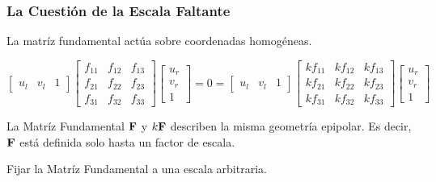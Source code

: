 \begin{frame}
    \frametitle{La Cuestión de la Escala Faltante}
    
    La matríz fundamental actúa sobre coordenadas homogéneas.

    \begin{equation*}
    \begin{bmatrix} u_l & v_l & 1 \end{bmatrix}
    \begin{bmatrix}
        f_{11} & f_{12} & f_{13} \\
        f_{21} & f_{22} & f_{23} \\
        f_{31} & f_{32} & f_{33}
    \end{bmatrix}
    \begin{bmatrix} u_r \\ v_r \\ 1 \end{bmatrix}
    = 0
    =
    \begin{bmatrix} u_l & v_l & 1 \end{bmatrix}
    \begin{bmatrix}
        kf_{11} & kf_{12} & kf_{13} \\
        kf_{21} & kf_{22} & kf_{23} \\
        kf_{31} & kf_{32} & kf_{33} \end{bmatrix}
    \begin{bmatrix} u_r \\ v_r \\ 1 \end{bmatrix}
    \end{equation*}

    La Matríz Fundamental $\boldsymbol{\mathbf{F}}$ y $k\boldsymbol{\mathbf{F}}$ describen la misma geometría epipolar. Es decir, $\boldsymbol{\mathbf{F}}$ está definida solo hasta un factor de escala.

    Fijar la Matríz Fundamental a una escala arbitraria.

    \begin{center}
    \end{center}
    
\end{frame}

